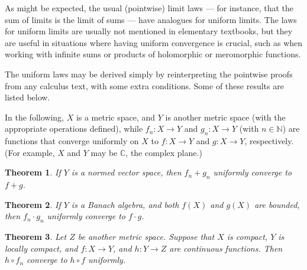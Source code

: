 \documentclass[12pt]{article}
\newcommand{\nat}{\mathbb{N}}
\newcommand{\complex}{\mathbb{C}}
\newtheorem{thm}{Theorem}
\begin{document}
As might be expected, the usual (pointwise) limit laws --- for instance, that the sum of limits is the limit of sums --- have analogues for uniform limits.  The laws for uniform limits are usually not mentioned in elementary textbooks, but they are useful in situations where having uniform convergence is crucial,
such as when working with infinite sums or products of holomorphic or meromorphic functions.

The uniform laws may be derived simply by reinterpreting the pointwise proofs from any calculus text, with some extra conditions.  Some of these results are listed below.  

In the following, $X$ is a metric space, and $Y$ is another metric space (with the appropriate operations defined), while $f_n\colon X \to Y$ and $g_n\colon X \to Y$ (with $n \in \nat$)
are functions that converge uniformly on $X$ to $f\colon X \to Y$ and $g\colon X \to Y$, respectively.  (For example, $X$ and $Y$ may be $\complex$, the complex plane.)

\begin{thm}
If $Y$ is a normed vector space, 
then
$f_n + g_n$ uniformly converge to $f + g$.
\end{thm}

\begin{thm}
If $Y$ is a Banach algebra, and both $f(X)$ and $g(X)$ are bounded,
then $f_n \cdot g_n$ uniformly converge to $f \cdot g$.
\end{thm}

\begin{thm}
Let $Z$ be another metric space. 
Suppose that $X$ is compact, $Y$ is locally compact,
and $f\colon X \to Y$, and $h\colon Y \to Z$
are continuous functions.  Then $h \circ f_n$ converge to $h \circ f$
uniformly.
\end{thm}
\end{document}

